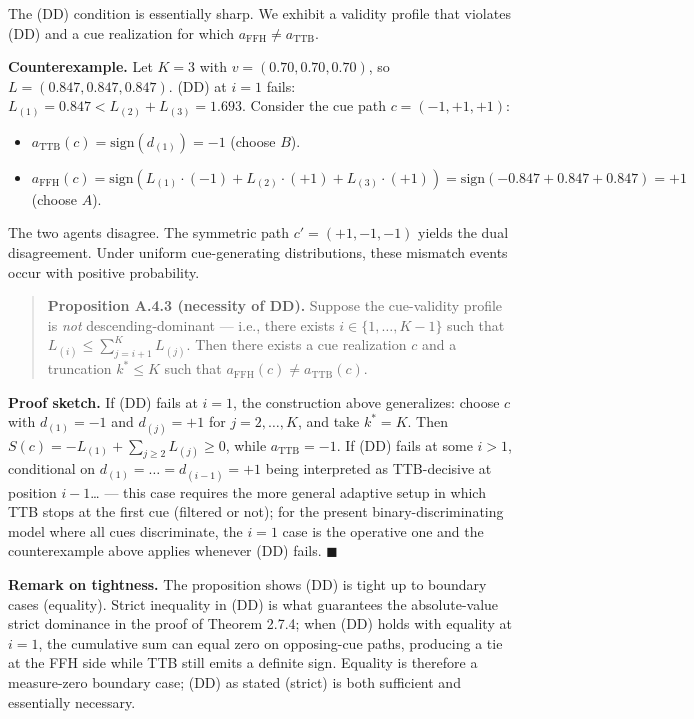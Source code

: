 \documentclass{article}
\providecommand{\tightlist}{\setlength{\itemsep}{0pt}\setlength{\parskip}{0pt}}
\begin{document}
The (DD) condition is essentially sharp. We exhibit a validity profile
that violates (DD) and a cue realization for which
\(a_{\mathrm{FFH}} \neq a_{\mathrm{TTB}}\).

\textbf{Counterexample.} Let \(K = 3\) with \(v = (0.70, 0.70, 0.70)\),
so \(L = (0.847, 0.847, 0.847)\). (DD) at \(i = 1\) fails:
\(L_{(1)} = 0.847 < L_{(2)} + L_{(3)} = 1.693\). Consider the cue path
\(c = (-1, +1, +1)\):

\begin{itemize}
\tightlist
\item
  \(a_{\mathrm{TTB}}(c) = \mathrm{sign}(d_{(1)}) = -1\) (choose \(B\)).
\item
  \(a_{\mathrm{FFH}}(c) = \mathrm{sign}(L_{(1)} \cdot (-1) + L_{(2)} \cdot (+1) + L_{(3)} \cdot (+1)) = \mathrm{sign}(-0.847 + 0.847 + 0.847) = +1\)
  (choose \(A\)).
\end{itemize}

The two agents disagree. The symmetric path \(c' = (+1, -1, -1)\) yields
the dual disagreement. Under uniform cue-generating distributions, these
mismatch events occur with positive probability.

\begin{quote}
\textbf{Proposition A.4.3 (necessity of DD).} Suppose the cue-validity
profile is \emph{not} descending-dominant --- i.e., there exists
\(i \in \{1, \ldots, K-1\}\) such that
\(L_{(i)} \leq \sum_{j=i+1}^{K} L_{(j)}\). Then there exists a cue
realization \(c\) and a truncation \(k^{*} \leq K\) such that
\(a_{\mathrm{FFH}}(c) \neq a_{\mathrm{TTB}}(c)\).
\end{quote}

\textbf{Proof sketch.} If (DD) fails at \(i = 1\), the construction
above generalizes: choose \(c\) with \(d_{(1)} = -1\) and
\(d_{(j)} = +1\) for \(j = 2, \ldots, K\), and take \(k^{*} = K\). Then
\(S(c) = -L_{(1)} + \sum_{j \geq 2} L_{(j)} \geq 0\), while
\(a_{\mathrm{TTB}} = -1\). If (DD) fails at some \(i > 1\), conditional
on \(d_{(1)} = \ldots = d_{(i-1)} = +1\) being interpreted as
TTB-decisive at position \(i-1\)\ldots{} --- this case requires the more
general adaptive setup in which TTB stops at the first cue (filtered or
not); for the present binary-discriminating model where all cues
discriminate, the \(i = 1\) case is the operative one and the
counterexample above applies whenever (DD) fails. \(\blacksquare\)

\textbf{Remark on tightness.} The proposition shows (DD) is tight up to
boundary cases (equality). Strict inequality in (DD) is what guarantees
the absolute-value strict dominance in the proof of Theorem 2.7.4; when
(DD) holds with equality at \(i = 1\), the cumulative sum can equal zero
on opposing-cue paths, producing a tie at the FFH side while TTB still
emits a definite sign. Equality is therefore a measure-zero boundary
case; (DD) as stated (strict) is both sufficient and essentially
necessary.
\end{document}
